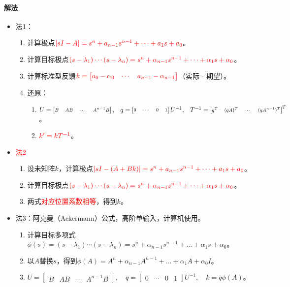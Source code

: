 \documentclass[
12pt, %
a4paper, 
oneside, %
]{scrartcl}
\begin{document}
\paragraph{解法}
\begin{itemize}
\item 法1：
\begin{enumerate}
\item 计算极点$ \textcolor{red}{|sI - A| = s^n + a_{n - 1} s^{n - 1} + \dots + a_1 s + a_0} $。
\item 计算目标极点$ \textcolor{red}{(s - \lambda_1) \cdots (s - \lambda_n) = s^n + \alpha_{n - 1} s^{n - 1} + \dots + \alpha_1 s + \alpha_0} $。
\item 计算标准型反馈$ \textcolor{red}{k = \begin{bmatrix} a_0 - \alpha_0 & \cdots & a_{n - 1} - \alpha_{n - 1} \end{bmatrix}} $（实际 - 期望）。
\item 还原：
\begin{enumerate}
\item $ {\scriptsize U = \begin{bmatrix} B & AB & \cdots & A^{n - 1} B \end{bmatrix}, \quad q = \begin{bmatrix} 0 & \cdots & 0 & 1 \end{bmatrix} U^{-1}, \quad T^{-1} = \begin{bmatrix} q^T & (qA)^T & \cdots & (qA^{n - 1})^T \end{bmatrix}^T} $。
\item $ \textcolor{red}{k' = k T^{-1}} $。
\end{enumerate}
\end{enumerate}
\item \textcolor{red}{法2}
\begin{enumerate}
\item 设未知阵$ k $，计算极点$ \textcolor{red}{|sI - (A + B k)| = s^n + a_{n - 1} s^{n - 1} + \dots + a_1 s + a_0} $。
\item 计算目标极点$ \textcolor{red}{(s - \lambda_1) \cdots (s - \lambda_n) = s^n + \alpha_{n - 1} s^{n - 1} + \dots + \alpha_1 s + \alpha_0} $。
\item 两式\textcolor{red}{对应位置系数相等}，得到$ k $。
\end{enumerate}
\item 法3：阿克曼（Ackermann）公式，高阶单输入，计算机使用。
\begin{enumerate}
\item 计算目标多项式$ \phi(s) = (s - \lambda_1) \cdots (s - \lambda_n) = s^n + \alpha_{n - 1} s^{n - 1} + \dots + \alpha_1 s + \alpha_0 $。
\item 以$ A $替换$ s $，得到$ \phi(A) = A^n + \alpha_{n - 1} A^{n - 1} + \dots + \alpha_1 A + \alpha_0 I $。
\item $ U = \begin{bmatrix} B & AB & \cdots & A^{n - 1} B \end{bmatrix}, \quad q = \begin{bmatrix} 0 & \cdots & 0 & 1 \end{bmatrix} U^{-1}, \quad k = q \phi(A) $。
\end{enumerate}
\end{itemize}
\end{document}
